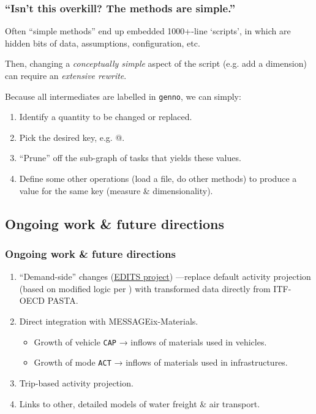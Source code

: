 \documentclass[12pt,aspectratio=169]{beamer}
\begin{document}
\begin{frame}[fragile]
\frametitle{“Isn't this overkill? The methods are simple.”}

Often “simple methods” end up embedded 1000+-line ‘scripts’, in which are hidden bits of data, assumptions, configuration, etc.

\smallskip
Then, changing a \emph{conceptually simple} aspect of the script (e.g. add a dimension) can require an \emph{extensive rewrite}.

\bigskip
Because all intermediates are labelled in \texttt{genno}, we can simply:
\begin{enumerate}
  \item Identify a quantity to be changed or replaced.
  \item Pick the desired key, e.g. @.
  \item “Prune” off the sub-graph of tasks that yields these values.
  \item Define some other operations (load a file, do other methods) to produce a value for the same key (measure \& dimensionality).
\end{enumerate}
\end{frame}

\subsection{Ongoing work \& future directions}

\begin{frame}
\frametitle{Ongoing work \& future directions}

\begin{enumerate}
  \item “Demand-side” changes (\href{https://iiasa.ac.at/projects/edits}{EDITS project}) —replace default activity projection (based on modified logic per \textcite{schafer-2009}) with transformed data directly from ITF-OECD PASTA.
  \item Direct integration with MESSAGEix-Materials.
  \begin{itemize}
    \item Growth of vehicle \texttt{CAP} → inflows of materials used in vehicles.
    \item Growth of mode \texttt{ACT} → inflows of materials used in infrastructures.
  \end{itemize}
  \item Trip-based activity projection.
  \item Links to other, detailed models of water freight \& air transport.
\end{enumerate}

\end{frame}
\end{document}
